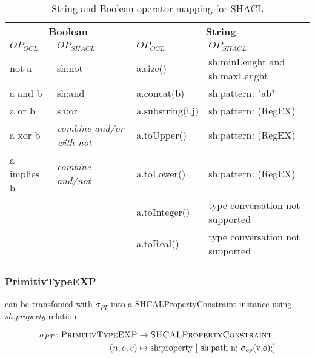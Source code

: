 \documentclass[runningheads]{llncs}
\begin{document}
\begin{table}[h]
\begin{tabular}{|l|l|l|l|}
        \multicolumn{2}{|c|}{\textbf{Boolean}} & \multicolumn{2}{c|}{\textbf{String}}                                                      \\
        \(OP_{OCL}\)                           & \(OP_{SHACL}\)                       & \(OP_{OCL}\)     & \(OP_{SHACL}\)                  \\\hline
        not a                                  & sh:not                               & a.size()         & sh:minLenght and sh:maxLenght   \\
        a and b                                & sh:and                               & a.concat(b)      & sh:pattern: "ab"                \\
        a or b                                 & sh:or                                & a.substring(i,j) & sh:pattern: (RegEX)             \\
        a xor b                                & \textit{combine and/or with not}     & a.toUpper()      & sh:pattern: (RegEX)             \\
        a implies b                            & \textit{combine and/not}             & a.toLower()      & sh:pattern: (RegEX)             \\
                                               &                                      & a.toInteger()    & type conversation not supported \\
                                               &                                      & a.toReal()       & type conversation not supported \\\hline
    \end{tabular}
    \caption{String and Boolean operator mapping for SHACL}
    \label{SCALOP2}
\end{table}
\subsubsection{PrimitivTypeEXP}
can be transfomed with \(\sigma_{PT}\) into a SHCALPropertyConstraint instance using \textit{sh:property} relation.
\begin{definition}
    \begin{align*}
        \sigma_{PT}\colon\textsc{PrimitivTypeEXP} & \to\textsc{SHCALPropertyConstraint}                           \\
        (n,o,v)                                   & \mapsto\text{sh:property [ sh:path n; \(\sigma_{op}\)(v,o);]} \\
    \end{align*}
\end{definition}
\end{document}
